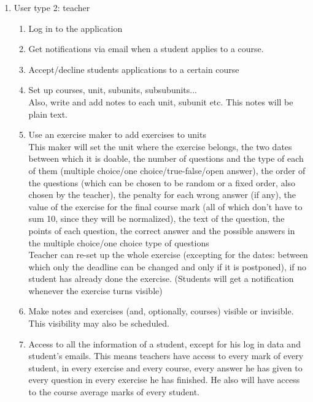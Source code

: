 \documentclass{article}
\begin{document}
\begin{enumerate}
\begin{enumerate}
\begin{enumerate}
\begin{enumerate}
			\end{enumerate}
			\item User type 2: teacher
			\begin{enumerate}
				\item Log in to the application\\
				\item Get notifications via email when a student applies to a course.\\
				\item Accept/decline students applications to a certain course\\
				\item Set up courses, unit, subunits, subsubunits...\\
				Also, write and add  notes to each unit, subunit etc. This notes will be plain text.\\
				\item Use an exercise maker to add exercises to units\\
				This maker will set the unit where the exercise belongs, the two dates between which it is doable, the number of questions and the type of each of them (multiple choice/one choice/true-false/open answer), the order of the questions (which can be chosen to be random or a fixed order, also chosen by the teacher), the penalty for each wrong answer (if any), the value of the exercise for the final course mark (all of which don't have to sum 10, since they will be normalized), the text of the question, the points of each question, the correct answer and the possible answers in the multiple choice/one choice type of questions\\
				Teacher can re-set up the whole exercise (excepting for the dates: between which only the deadline can be changed and only if it is postponed), if no student has already done the exercise. (Students will get a notification whenever the exercise turns visible)\\
				\item Make notes and exercises (and, optionally, courses) visible or invisible. This visibility may also be scheduled.\\
				\item Access to all the information of a student, except for his log in data and student's emails. This means teachers have access to every mark of every student, in every exercise and every course, every answer he has given to every question in every exercise he has finished. He also will have access to the course average marks of every student.\\

\end{enumerate}
\end{enumerate}
\end{enumerate}
\end{enumerate}
\end{document}
